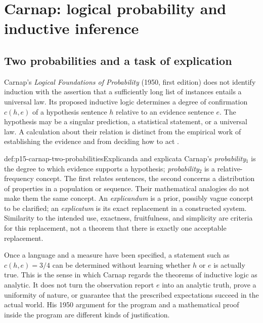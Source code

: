 \chapter{Carnap: logical probability and inductive inference}
\label{sec:p15-carnap-logical-probability-and-induction}

\section{Two probabilities and a task of explication}
\label{sec:p15-carnap-explication}

Carnap's \emph{Logical Foundations of Probability} (1950, first edition)
does not identify induction with the assertion that a sufficiently long
list of instances entails a universal law. Its proposed inductive logic
determines a degree of confirmation \(c(h,e)\) of a hypothesis sentence
\(h\) relative to an evidence sentence \(e\). The hypothesis may be a
singular prediction, a statistical statement, or a universal law. A
calculation about their relation is distinct from the empirical work of
establishing the evidence and from deciding how to act
\cite[preface, pp.~v--vi; secs.~1--3, 45]{Carnap1950Probability}.

\begin{hbdefinition}{def:p15-carnap-two-probabilities}{Explicanda and explicata}
Carnap's \emph{probability\(_1\)} is the degree to which evidence supports
a hypothesis; \emph{probability\(_2\)} is a relative-frequency concept.
The first relates sentences, the second concerns a distribution of
properties in a population or sequence. Their mathematical analogies do
not make them the same concept. An \emph{explicandum} is a prior,
possibly vague concept to be clarified; an \emph{explicatum} is its exact
replacement in a constructed system. Similarity to the intended use,
exactness, fruitfulness, and simplicity are criteria for this replacement,
not a theorem that there is exactly one acceptable replacement.
\end{hbdefinition}

Once a language and a measure have been specified, a statement such as
\(c(h,e)=3/4\) can be determined without learning whether \(h\) or
\(e\) is actually true. This is the sense in which Carnap regards the
theorems of inductive logic as analytic. It does not turn the observation
report \(e\) into an analytic truth, prove a uniformity of nature, or
guarantee that the prescribed expectations succeed in the actual world.
His 1950 argument for the program and a mathematical proof inside the
program are different kinds of justification.


